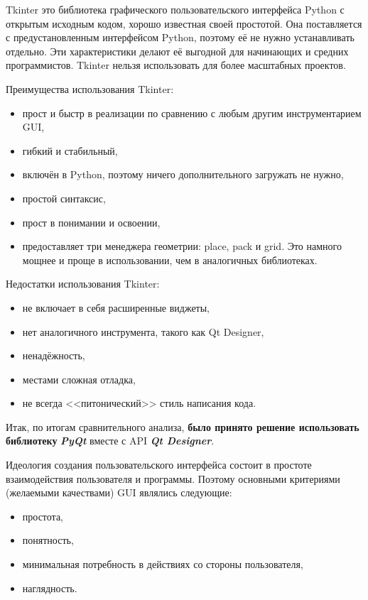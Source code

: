 Tkinter это библиотека графического пользовательского интерфейса Python с открытым исходным кодом, хорошо известная своей простотой. Она поставляется с предустановленным интерфейсом Python, поэтому её не нужно устанавливать отдельно. Эти характеристики делают её выгодной для начинающих и средних программистов. Tkinter нельзя использовать для более масштабных проектов.

Преимущества использования Tkinter:
\begin{itemize}
	\item прост и быстр в реализации по сравнению с любым другим инструментарием GUI,
	\item гибкий и стабильный,
	\item включён в Python, поэтому ничего дополнительного загружать не нужно,
	\item простой синтаксис,
	\item прост в понимании и освоении,
	\item предоставляет три менеджера геометрии: place, pack и grid. Это намного мощнее и проще в использовании, чем в аналогичных библиотеках.
\end{itemize}

Недостатки использования Tkinter:
\begin{itemize}
	\item не включает в себя расширенные виджеты,
	\item нет аналогичного инструмента, такого как Qt Designer,
	\item ненадёжность,
	\item местами сложная отладка,
	\item не всегда <<питонический>> стиль написания кода.
\end{itemize}

Итак, по итогам сравнительного анализа, \textbf{было принято решение использовать библиотеку} \textbf{\textit{PyQt}} вместе с API \textbf{\textit{Qt Designer}}.

Идеология создания пользовательского интерфейса состоит в простоте взаимодействия пользователя и программы. Поэтому основными критериями (желаемыми качествами) GUI являлись следующие:
\begin{itemize}
	\item простота,
	\item понятность,
	\item минимальная потребность в действиях со стороны пользователя,
	\item наглядность.
\end{itemize}

